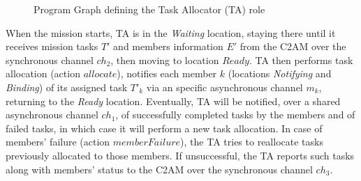 \begin{figure}[ht!]
    \centering
    \scalebox{.75}{}
    \caption{Program Graph defining the Task Allocator (TA) role}
    \label{fig:ta_pg}
\end{figure}


When the mission starts, TA is in the \textit{Waiting} location, staying there until it receives mission tasks $T'$ and members information $E'$ from the C2AM over the synchronous channel $ch_2$, then moving to location $Ready$. TA then performs task allocation (action $allocate$),  notifies each member $k$ (locations \textit{Notifying} and \textit{Binding}) of its assigned task $T'_k$ via an specific asynchronous channel $m_k$, returning to the \textit{Ready} location. Eventually, TA will be notified, over a shared asynchronous channel $ch_1$, of successfully completed tasks by the members and of failed tasks, in which case it will perform a new task allocation. In case of members' failure (action $memberFailure$), the TA tries to reallocate tasks previously allocated to those members. If unsuccessful, the TA reports such tasks along with members' status to the C2AM over the synchronous channel $ch_3$. 

